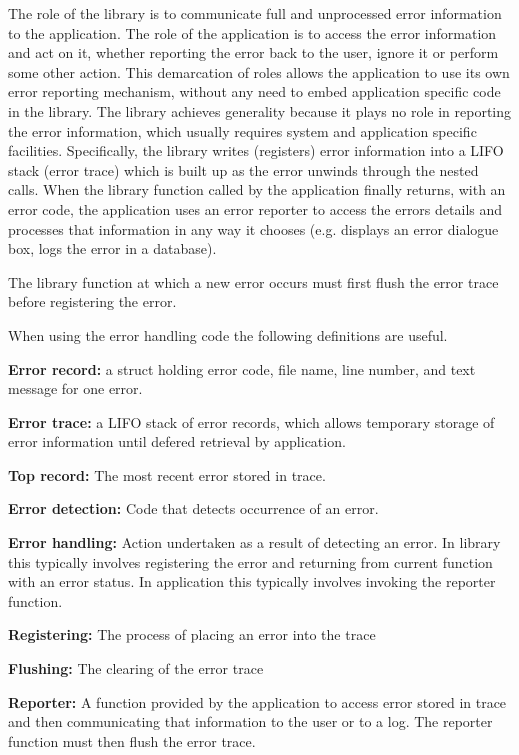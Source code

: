 The role of the library is to communicate full and
unprocessed error information to the application. The role of the
application is to access the error information and act on it, whether
reporting the error back to the user, ignore it or perform some other action.
This demarcation of roles allows the application to use its
own error reporting mechanism, without any need to embed application
specific code in the library. The library achieves generality
because it plays no role in reporting the error information, which
usually requires system and application specific facilities.
Specifically, the library writes (registers) error information into
a LIFO stack (error trace) which is built up as the error unwinds
through the nested calls. When the library function called by the
application finally returns, with an error code, the application
uses an error reporter to access the errors details and processes
that information in any way it chooses (e.g. displays an error
dialogue box, logs the error in a database).

The library function at which a new error occurs must first flush
the error trace before registering the error.

When using the error handling code the following definitions are useful.
\begin{description}
  \item{{\bf Error record:}} a struct holding error code, file name, line
	number, and text message for one error.
  \item{{\bf Error trace:}} a LIFO stack of error records, which allows
	temporary storage of error information until defered retrieval by
	application.
  \item{{\bf Top record:}} The most recent error stored in trace.
  \item{{\bf Error detection:}} Code that detects occurrence of an error.
  \item{{\bf Error handling:}} Action undertaken as a result of detecting an
	error. In library this typically involves registering the error and
	returning from current function with an error status. In application
        this typically involves invoking the reporter function.
  \item{{\bf Registering:}} The process of placing an error into the trace
  \item{{\bf Flushing:}} The clearing of the error trace
  \item{{\bf Reporter:}} A function provided by the application to access error
        stored in trace and then communicating that information
        to the user or to a log. The reporter function must then
        flush the error trace.
\end{description}

